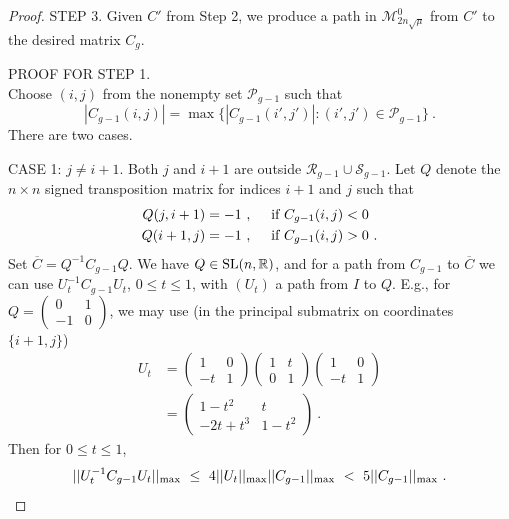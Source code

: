 \documentclass{amsart}
\theoremstyle{definition}
\theoremstyle{remark}
\numberwithin{equation}{section}
\begin{document}
{{\begin{proof}
 


STEP 3. Given $C'$ from Step 2, we produce a path in 
$\mathcal M^0_{2n\sqrt{\mu}}$ from $C'$ to the desired matrix $C_g$. 



PROOF  FOR STEP 1. 
\\ 
Choose $(i,j)$ from the nonempty set
$\mathcal P_{g-1}$ such that  
\[|C_{g-1}(i,j)|= \max \{|C_{g-1}(i',j')|: (i',j')\in \mathcal P_{g-1}\}\ .
\]     
There are two cases. 

CASE 1: $j\neq i+1$.  Both $j$ and $i+1$ are outside 
 $\mathcal R_{g-1} \cup \mathcal S_{g-1}$. 
Let $Q$ denote the $n\times n$ signed transposition 
matrix for indices 
$i+1$ and $j$ such that 
\begin{align*} 
Q(j,i+1) &  = -1 \ , \quad 
\textnormal{ if } C_{g-1}(i,j) < 0 \\ 
Q(i+1,j) &  = -1 \ , \quad 
\textnormal{ if } C_{g-1}(i,j) > 0 \ . 
\end{align*} 
Set $\overline C=Q^{-1}C_{g-1}Q$. 
We have $Q\in \textnormal{SL}(n,\mathbb R)$, and for a path 
from $C_{g-1}$ to $\overline C$ we can use 
$U_t^{-1}C_{g-1}U_t$, $0\leq t\leq 1$, with $(U_t)$ a path 
from $I$ to $Q$. 
E.g., for $Q=
\begin{pmatrix} 
0 & 1 \\ -1 & 0 
\end{pmatrix}$, we may use (in the principal submatrix on 
coordinates $\{i+1,j\}$) 
\begin{align*} 
U_t &= 
\begin{pmatrix} 
1 & 0 
\\ 
-t & 1
\end{pmatrix}
\begin{pmatrix} 
1 & t 
\\ 
0 & 1
\end{pmatrix}
\begin{pmatrix} 
1 & 0 
\\ 
-t & 1
\end{pmatrix} \\
&= 
\begin{pmatrix} 
1-t^2 & t 
\\ 
-2t +t^3 & 1-t^2
\end{pmatrix} \ . 
\end{align*} 
Then for $0\leq t\leq 1$, 
\[
||U_t^{-1}C_{g-1}U_t||_{\textnormal{max}} \ 
\leq \ 
4
||U_t||_{\textnormal{max}} 
||C_{g-1}||_{\textnormal{max}} \ 
 < \ 
5 ||C_{g-1}||_{\textnormal{max}} 
\ . 
\] 



\end{proof}}}
\end{document}
